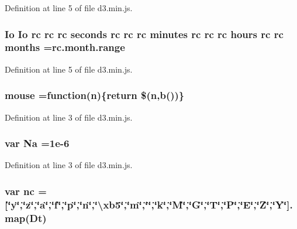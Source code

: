 Definition at line 5 of file d3.\+min.\+js.

\subsubsection[{months}]{ {\bf Io} {\bf Io} {\bf rc} {\bf rc} {\bf rc} {\bf seconds} {\bf rc} {\bf rc} {\bf rc} {\bf minutes} {\bf rc} {\bf rc} {\bf rc} {\bf hours} {\bf rc} {\bf rc} months ={\bf rc.\+month.\+range}}\label{d3_8min_8js_a12df43bc0f703ec2add1929503fe5fba}


Definition at line 5 of file d3.\+min.\+js.

\subsubsection[{mouse}]{ mouse =function({\bf n})\{{\bf return} \$({\bf n},{\bf b}())\}}\label{d3_8min_8js_a6fa0f68bd23907f0af3d201aca6abd23}


Definition at line 3 of file d3.\+min.\+js.

\subsubsection[{Na}]{\setlength{\rightskip}{0pt plus 5cm}var Na =1e-\/6}\label{d3_8min_8js_abe1e7915ecde85209146e6ef80d4b15e}


Definition at line 3 of file d3.\+min.\+js.

\subsubsection[{nc}]{\setlength{\rightskip}{0pt plus 5cm}var nc =[\char`\"{}y\char`\"{},\char`\"{}z\char`\"{},\char`\"{}{\bf a}\char`\"{},\char`\"{}{\bf f}\char`\"{},\char`\"{}p\char`\"{},\char`\"{}{\bf n}\char`\"{},\char`\"{}\textbackslash{}xb5\char`\"{},\char`\"{}m\char`\"{},\char`\"{}\char`\"{},\char`\"{}k\char`\"{},\char`\"{}M\char`\"{},\char`\"{}G\char`\"{},\char`\"{}T\char`\"{},\char`\"{}P\char`\"{},\char`\"{}E\char`\"{},\char`\"{}Z\char`\"{},\char`\"{}Y\char`\"{}].map(Dt)}\label{d3_8min_8js_a949164e34afd11a61d186ad9532208d8}


